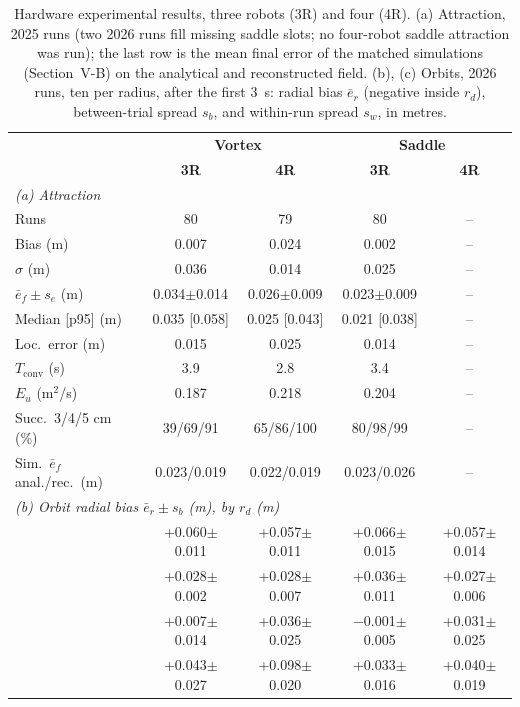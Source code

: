 \documentclass[lettersize,journal]{IEEEtran}
\newcommand{\rev}[1]{#1}
\begin{document}
\begin{table}[!t]
    \scriptsize
    \centering
    \caption{Hardware experimental results, three robots (3R) and four (4R). (a) Attraction, 2025 runs (two 2026 runs fill missing saddle slots; no four-robot saddle attraction was run); the last row is the mean final error of the matched simulations (Section~V-B) on the analytical and reconstructed field. (b), (c) Orbits, 2026 runs, ten per radius, after the first \rev{3}~s: radial bias $\bar e_r$ (negative inside $r_d$), between-trial spread $s_b$, and within-run spread $s_w$, in metres.}
    \label{tab:estimation_results}\label{tab:orbital_radius_comparison}
    \setlength{\tabcolsep}{1.5pt}
    \rev{\begin{tabular}{l|cc|cc}
\hline
 & \multicolumn{2}{c|}{\textbf{Vortex}} & \multicolumn{2}{c}{\textbf{Saddle}} \\
 & \textbf{3R} & \textbf{4R} & \textbf{3R} & \textbf{4R} \\
\hline
\multicolumn{5}{l}{\textit{(a) Attraction}} \\
\hline
Runs & 80 & 79 & 80 & -- \\
Bias (m) & 0.007 & 0.024 & 0.002 & -- \\
$\sigma$ (m) & 0.036 & 0.014 & 0.025 & -- \\
$\bar{e}_f \pm s_e$ (m) & 0.034$\pm$0.014 & 0.026$\pm$0.009 & 0.023$\pm$0.009 & -- \\
Median [p95] (m) & 0.035 [0.058] & 0.025 [0.043] & 0.021 [0.038] & -- \\
Loc.\ error (m) & 0.015 & 0.025 & 0.014 & -- \\
$T_{\mathrm{conv}}$ (s) & 3.9 & 2.8 & 3.4 & -- \\
$E_u$ (m$^2$/s) & 0.187 & 0.218 & 0.204 & -- \\
Succ.\ 3/4/5 cm (\%) & 39/69/91 & 65/86/100 & 80/98/99 & -- \\
Sim.\ $\bar{e}_f$ anal./rec.\ (m) & 0.023/0.019 & 0.022/0.019 & 0.023/0.026 & -- \\
\hline
\multicolumn{5}{l}{\textit{(b) Orbit radial bias $\bar e_r \pm s_b$ (m), by $r_d$ (m)}} \\
\hline
\quad 0.01 & +0.060$\pm$0.011 & +0.057$\pm$0.011 & +0.066$\pm$0.015 & +0.057$\pm$0.014 \\
\quad 0.10 & +0.028$\pm$0.002 & +0.028$\pm$0.007 & +0.036$\pm$0.011 & +0.027$\pm$0.006 \\
\quad 0.20 & +0.007$\pm$0.014 & +0.036$\pm$0.025 & $-$0.001$\pm$0.005 & +0.031$\pm$0.025 \\
\quad 0.30 & +0.043$\pm$0.027 & +0.098$\pm$0.020 & +0.033$\pm$0.016 & +0.040$\pm$0.019 \\

\end{tabular}}
\end{table}
\end{document}
